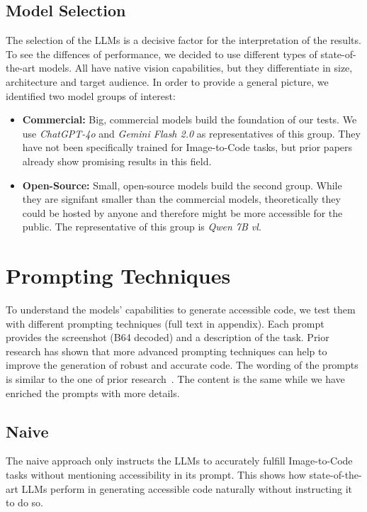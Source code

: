 \subsection{Model Selection}
The selection of the LLMs is a decisive factor for the interpretation of the results.
To see the diffences of performance, we decided to use different types of 
state-of-the-art models. All have native vision capabilities, but they differentiate 
in size, architecture and target audience.
In order to provide a general picture, we identified two model groups of interest:
\begin{itemize}
  \item \textbf{Commercial:} Big, commercial models build the foundation of our tests.
    We use \textit{ChatGPT-4o} and \textit{Gemini Flash 2.0} as representatives of this group.
    They have not been specifically trained for Image-to-Code tasks, but prior papers 
    already show promising results in this field.
  \item \textbf{Open-Source:} Small, open-source models build the second group. 
    While they are signifant smaller than the commercial models, theoretically they 
    could be hosted by anyone and therefore might be more accessible for the public.
    The representative of this group is \textit{Qwen 7B vl}.
\end{itemize}

\section{Prompting Techniques}
To understand the models' capabilities to generate accessible code, we test
them with different prompting techniques (full text in appendix). Each 
prompt provides the screenshot (B64 decoded) and a description of the
task.\newline
Prior research has shown that more 
advanced prompting techniques can help to improve the generation of robust and 
accurate code.
The wording of the prompts is similar to the one of prior research~\parencite{suh2025accessiblecode, xiao2024interaction2code}.
The content is the same while we have enriched the prompts with more details.\newline

\subsection{Naive}
The naive approach only instructs the LLMs to accurately fulfill Image-to-Code tasks
without mentioning accessibility in its prompt. This shows how state-of-the-art 
LLMs perform in generating accessible code naturally without instructing it to 
do so.

